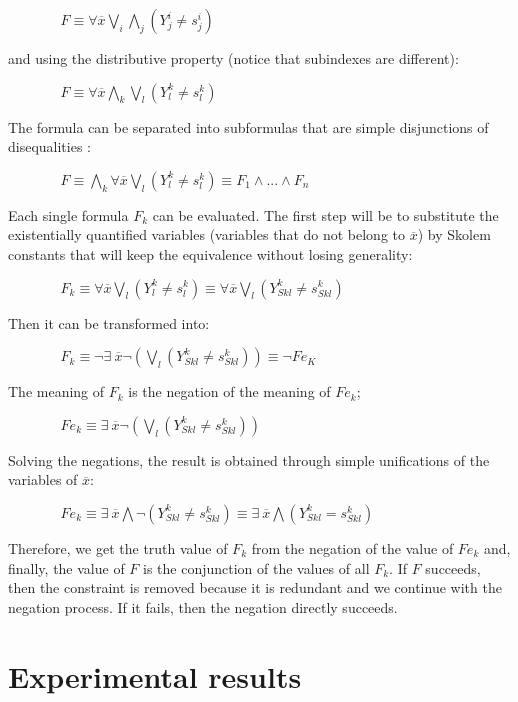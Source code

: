 \documentclass{llncs}
\begin{document}
$~~~~~~~~~~~~~~~~~ F \equiv \forall \overline{x} \bigvee_i\bigwedge_j (Y_j^i \neq s_j^i) $

\noindent
and using the distributive property (notice that subindexes are different):

$~~~~~~~~~~~~~~~~~ F \equiv \forall \overline{x} \bigwedge_k\bigvee_l (Y_l^k \neq s_l^k) $

The formula can be separated into subformulas that are simple
disjunctions of disequalities :

 $~~~~~~~~~~~~~~~~~ F \equiv \bigwedge_k \forall \overline{x} \bigvee_l (Y_l^k \neq s_l^k) \equiv F_1 \wedge ... \wedge F_n$

Each single formula $F_k$ can be evaluated. The first step will be to
substitute the existentially quantified variables (variables that do not
belong to $\overline{x}$) by Skolem constants that will keep
the equivalence without losing generality:

$~~~~~~~~~~~~~~~~~  F_k \equiv \forall \overline{x} \bigvee_l ( Y_l^k \neq s_l^k ) \equiv \forall \overline{x} \bigvee_l ( Y_{Sk l}^k \neq s_{Sk l}^k )  $

Then it can be transformed into:

$~~~~~~~~~~~~~~~~~ F_k \equiv  \neg \exists ~ \overline{x} \neg ( \bigvee_l (Y_{Sk l}^k \neq s_{Sk l}^k) ) \equiv \neg Fe_K $

The meaning of $F_k$ is the negation of the meaning of $Fe_k$;

$~~~~~~~~~~~~~~~~~ Fe_k \equiv \exists ~ \overline{x} \neg ( \bigvee_l (Y_{Sk l}^k \neq s_{Sk l}^k)) $
 
Solving the negations, the result is obtained through simple unifications of the variables of $\overline{x}$:

$~~~~~~~~~~~~~~~~~  Fe_k  \equiv \exists ~ \overline{x} \bigwedge \neg (Y_{Sk l}^k \neq s_{Sk l}^k)  \equiv \exists ~ \overline{x} \bigwedge (Y_{Sk l}^k = s_{Sk l}^k)  $

        Therefore, we get the truth value of $F_k$ from the
        negation of the value of $Fe_k$ and, finally, the value of $F$ is
        the conjunction of the values of all $F_k$. If $F$
        succeeds, then the constraint is removed because it is redundant
        and we continue with the negation process. If it fails, then
        the negation directly succeeds.


\section{Experimental results}
\label{results}
\end{document}
